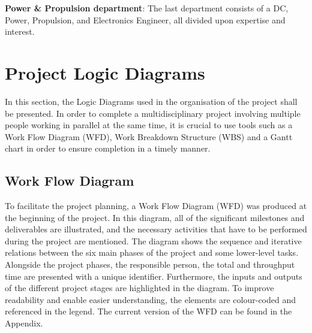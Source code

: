 \textbf{Power \& Propulsion department}: The last department consists of a DC, Power, Propulsion, and Electronics Engineer, all divided upon expertise and interest.

\section{Project Logic Diagrams}
In this section, the Logic Diagrams used in the organisation of the project shall be presented.
In order to complete a multidisciplinary project involving multiple people working in parallel at the same time, it is crucial to use tools such as a Work Flow Diagram (WFD), Work Breakdown Structure (WBS) and a Gantt chart in order to ensure completion in a timely manner.

\subsection{Work Flow Diagram}
\label{subsec:WorkFlowDiagram}
To facilitate the project planning, a Work Flow Diagram (WFD) was produced at the beginning of the project. In this diagram, all of the significant milestones and deliverables are illustrated, and the necessary activities that have to be performed during the project are mentioned.
The diagram shows the sequence and iterative relations between the six main phases of the project and some lower-level tasks. Alongside the project phases, the responsible person, the total and throughput time are presented with a unique identifier. Furthermore, the inputs and outputs of the different project stages are highlighted in the diagram. To improve readability and enable easier understanding, the elements are colour-coded and referenced in the legend. The current version of the WFD can be found in the Appendix.




